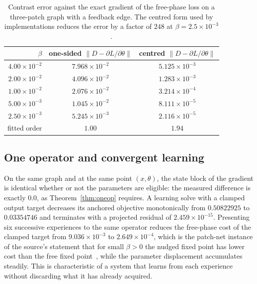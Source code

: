 \documentclass[11pt]{article}
\theoremstyle{definition}
\theoremstyle{remark}
\begin{document}
\begin{table}[t]
\centering
\small
\begin{tabular}{rcc}
\toprule
$\beta$ & one-sided $\|D-\partial L/\partial\theta\|$ & centred $\|D-\partial L/\partial\theta\|$\\
\midrule
$4.00\times10^{-2}$ & $7.968\times10^{-2}$ & $5.125\times10^{-3}$\\
$2.00\times10^{-2}$ & $4.096\times10^{-2}$ & $1.283\times10^{-3}$\\
$1.00\times10^{-2}$ & $2.076\times10^{-2}$ & $3.214\times10^{-4}$\\
$5.00\times10^{-3}$ & $1.045\times10^{-2}$ & $8.111\times10^{-5}$\\
$2.50\times10^{-3}$ & $5.245\times10^{-3}$ & $2.116\times10^{-5}$\\
\midrule
fitted order & $1.00$ & $1.94$\\
\bottomrule
\end{tabular}
\caption{Contrast error against the exact gradient of the free-phase loss on a three-patch graph with
a feedback edge. The centred form used by implementations reduces the error by a factor of $248$ at
$\beta=2.5\times10^{-3}$.}
\label{tab:order}
\end{table}

\subsection{One operator and convergent learning}
On the same graph and at the same point $(x,\theta)$, the state block of the gradient is identical
whether or not the parameters are eligible: the measured difference is exactly $0.0$, as
Theorem~\ref{thm:oneop} requires. A learning solve with a clamped output target decreases its anchored
objective monotonically from $0.50822925$ to $0.03354746$ and terminates with a projected residual of
$2.459\times10^{-15}$. Presenting six successive experiences to the same operator reduces the
free-phase cost of the clamped target from $9.036\times10^{-3}$ to $2.649\times10^{-4}$, which is the
patch-net instance of the source's statement that for small $\beta>0$ the nudged fixed point has lower
cost than the free fixed point~\cite{scellier2017}, while the
parameter displacement accumulates steadily. This is characteristic of a system that learns from each
experience without discarding what it has already acquired.
\end{document}
